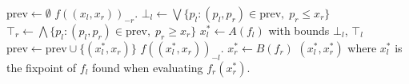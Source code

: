 \begin{algorithm}[h]
  \caption{\citep{fasterTarski}}\label{fixDecompAlg}
  \begin{algorithmic}[1]
    \State $\mathrm{prev} \gets \emptyset$
        \Return $f((x_l, x_r))_{-r}$.
      \EndProcedure
      \State $\bot_l \gets \bigvee\{p_l : (p_l, p_r) \in \mathrm{prev}, \; p_r \leq x_r \}$
      \State $\top_r \gets \bigwedge\{p_l : (p_l, p_r) \in \mathrm{prev}, \; p_r \geq x_r \}$
      \State $x_l^* \gets A(f_l)$ with bounds $\bot_l$, $\top_l$
      \State $\mathrm{prev} \gets \mathrm{prev} \cup \{(x_l^*, x_r)\}$
      \State \Return $f((x_l^*, x_r))_{-l}$.
    \EndProcedure
    \State $x_r^* \gets B(f_r)$
    \State \Return $(x_l^*, x_r^*)$ where $x_l^*$ is the fixpoint of $f_l$ 
    found when evaluating $f_r(x_r^*)$.
  \EndProcedure
  \end{algorithmic}
\end{algorithm}

